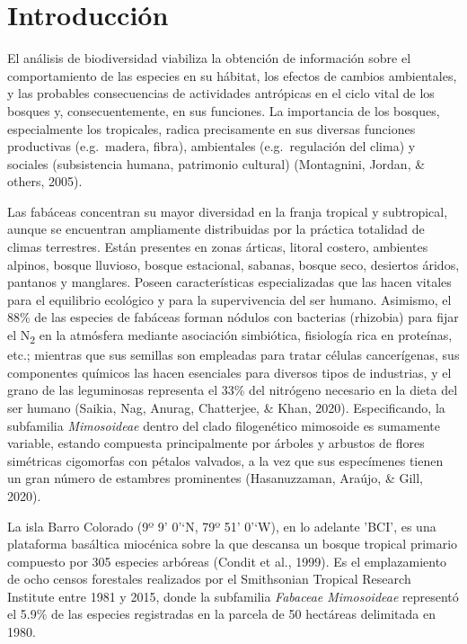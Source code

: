 \documentclass[11pt,]{article}
\begin{document}
\vskip 6.5pt


\noindent  \section{Introducción}\label{introducciuxf3n}

El análisis de biodiversidad viabiliza la obtención de información sobre
el comportamiento de las especies en su hábitat, los efectos de cambios
ambientales, y las probables consecuencias de actividades antrópicas en
el ciclo vital de los bosques y, consecuentemente, en sus funciones. La
importancia de los bosques, especialmente los tropicales, radica
precisamente en sus diversas funciones productivas (e.g.~madera, fibra),
ambientales (e.g.~regulación del clima) y sociales (subsistencia humana,
patrimonio cultural) (Montagnini, Jordan, \& others, 2005).

Las fabáceas concentran su mayor diversidad en la franja tropical y
subtropical, aunque se encuentran ampliamente distribuidas por la
práctica totalidad de climas terrestres. Están presentes en zonas
árticas, litoral costero, ambientes alpinos, bosque lluvioso, bosque
estacional, sabanas, bosque seco, desiertos áridos, pantanos y
manglares. Poseen características especializadas que las hacen vitales
para el equilibrio ecológico y para la supervivencia del ser humano.
Asimismo, el 88\% de las especies de fabáceas forman nódulos con
bacterias (rhizobia) para fijar el N\textsubscript{2} en la atmósfera
mediante asociación simbiótica, fisiología rica en proteínas, etc.;
mientras que sus semillas son empleadas para tratar células
cancerígenas, sus componentes químicos las hacen esenciales para
diversos tipos de industrias, y el grano de las leguminosas representa
el 33\% del nitrógeno necesario en la dieta del ser humano (Saikia, Nag,
Anurag, Chatterjee, \& Khan, 2020). Especificando, la subfamilia
\emph{Mimosoideae} dentro del clado filogenético mimosoide es sumamente
variable, estando compuesta principalmente por árboles y arbustos de
flores simétricas cigomorfas con pétalos valvados, a la vez que sus
especímenes tienen un gran número de estambres prominentes
(Hasanuzzaman, Araújo, \& Gill, 2020).

La isla Barro Colorado (9º 9' 0'`N, 79º 51' 0'`W), en lo adelante 'BCI',
es una plataforma basáltica miocénica sobre la que descansa un bosque
tropical primario compuesto por 305 especies arbóreas (Condit et al.,
1999). Es el emplazamiento de ocho censos forestales realizados por el
Smithsonian Tropical Research Institute entre 1981 y 2015, donde la
subfamilia \emph{Fabaceae Mimosoideae} representó el 5.9\% de las
especies registradas en la parcela de 50 hectáreas delimitada en 1980.
\end{document}
